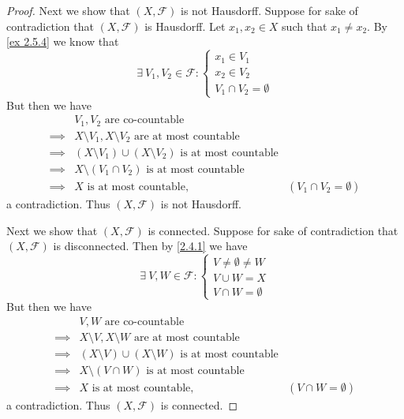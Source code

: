 \begin{proof}
  Next we show that \((X, \mathcal{F})\) is not Hausdorff.
  Suppose for sake of contradiction that \((X, \mathcal{F})\) is Hausdorff.
  Let \(x_1, x_2 \in X\) such that \(x_1 \neq x_2\).
  By \cref{ex 2.5.4} we know that
  \[
    \exists\ V_1, V_2 \in \mathcal{F} : \begin{cases}
      x_1 \in V_1 \\
      x_2 \in V_2 \\
      V_1 \cap V_2 = \emptyset
    \end{cases}
  \]
  But then we have
  \begin{align*}
             & V_1, V_2 \text{ are co-countable}                                                                  \\
    \implies & X \setminus V_1, X \setminus V_2 \text{ are at most countable}                                     \\
    \implies & (X \setminus V_1) \cup (X \setminus V_2) \text{ is at most countable}                              \\
    \implies & X \setminus (V_1 \cap V_2) \text{ is at most countable}                                            \\
    \implies & X \text{ is at most countable},                                       & (V_1 \cap V_2 = \emptyset)
  \end{align*}
  a contradiction.
  Thus \((X, \mathcal{F})\) is not Hausdorff.

  Next we show that \((X, \mathcal{F})\) is connected.
  Suppose for sake of contradiction that \((X, \mathcal{F})\) is disconnected.
  Then by \cref{2.4.1} we have
  \[
    \exists\ V, W \in \mathcal{F} : \begin{cases}
      V \neq \emptyset \neq W \\
      V \cup W = X            \\
      V \cap W = \emptyset
    \end{cases}
  \]
  But then we have
  \begin{align*}
             & V, W \text{ are co-countable}                                                              \\
    \implies & X \setminus V, X \setminus W \text{ are at most countable}                                 \\
    \implies & (X \setminus V) \cup (X \setminus W) \text{ is at most countable}                          \\
    \implies & X \setminus (V \cap W) \text{ is at most countable}                                        \\
    \implies & X \text{ is at most countable},                                   & (V \cap W = \emptyset)
  \end{align*}
  a contradiction.
  Thus \((X, \mathcal{F})\) is connected.


\end{proof}
